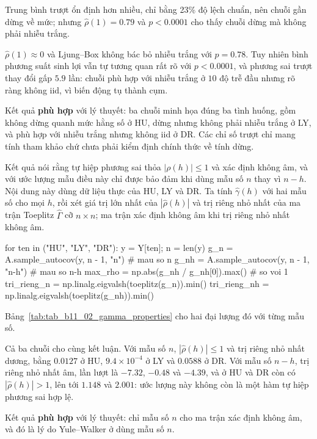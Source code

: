  Trung bình trượt ổn định hơn nhiều, chỉ bằng 23\% độ lệch chuẩn, nên chuỗi gần dừng về mức; nhưng $\hat\rho(1)=0.79$ và $p<0.0001$ cho thấy chuỗi dừng mà không phải nhiễu trắng.

 $\hat\rho(1)\approx0$ và Ljung--Box không bác bỏ nhiễu trắng với $p=0.78$. Tuy nhiên bình phương suất sinh lợi vẫn tự tương quan rất rõ với $p<0.0001$, và phương sai trượt thay đổi gấp $5.9$ lần: chuỗi phù hợp với nhiễu trắng ở $10$ độ trễ đầu nhưng rõ ràng không iid, vì biến động tụ thành cụm.

 Kết quả \textbf{phù hợp} với lý thuyết: ba chuỗi minh họa đúng ba tình huống, gồm không dừng quanh mức hằng số ở HU, dừng nhưng không phải nhiễu trắng ở LY, và phù hợp với nhiễu trắng nhưng không iid ở DR. Các chỉ số trượt chỉ mang tính tham khảo chứ chưa phải kiểm định chính thức về tính dừng.

 Kết quả  nói rằng tự hiệp phương sai thỏa $|\rho(h)|\le1$ và xác định không âm, và với ước lượng mẫu điều này chỉ được bảo đảm khi dùng mẫu số $n$ thay vì $n-h$.
 Nội dung này dùng dữ liệu thực của HU, LY và DR. Ta tính $\hat\gamma(h)$ với hai mẫu số cho mọi $h$, rồi xét giá trị lớn nhất của $|\hat\rho(h)|$ và trị riêng nhỏ nhất của ma trận Toeplitz $\hat\Gamma$ cỡ $n\times n$; ma trận xác định không âm khi trị riêng nhỏ nhất không âm.
\begin{codeblock}
for ten in ("HU", "LY", "DR"):
    y = Y[ten]; n = len(y)
    g_n = A.sample_autocov(y, n - 1, "n")          # mau so n
    g_nh = A.sample_autocov(y, n - 1, "n-h")       # mau so n-h
    max_rho = np.abs(g_nh / g_nh[0]).max()         # so voi 1
    tri_rieng_n = np.linalg.eigvalsh(toeplitz(g_n)).min()
    tri_rieng_nh = np.linalg.eigvalsh(toeplitz(g_nh)).min()
\end{codeblock}
 Bảng~\ref{tab:tab_b11_02_gamma_properties} cho hai đại lượng đó với từng mẫu số.

 Cả ba chuỗi cho cùng kết luận. Với mẫu số $n$, $|\hat\rho(h)|\le1$ và trị riêng nhỏ nhất dương, bằng $0.0127$ ở HU, $9.4\times10^{-4}$ ở LY và $0.0588$ ở DR. Với mẫu số $n-h$, trị riêng nhỏ nhất âm, lần lượt là $-7.32$, $-0.48$ và $-4.39$, và ở HU và DR còn có $|\hat\rho(h)|>1$, lên tới $1.148$ và $2.001$: ước lượng này không còn là một hàm tự hiệp phương sai hợp lệ.

 Kết quả \textbf{phù hợp} với lý thuyết: chỉ mẫu số $n$ cho ma trận xác định không âm, và đó là lý do Yule--Walker ở  dùng mẫu số $n$.

